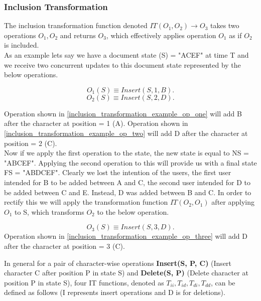 \documentclass[9pt, titlepage]{article}
\begin{document}
  \subsubsection{Inclusion Transformation}
  The inclusion transformation function denoted \(IT(O_{1}, O_{2}) \rightarrow O_{3}\) takes two operations \(O_{1}, O_{2}\) and returns \(O_{3}\),
  which effectively applies operation \(O_{1}\) as if \(O_{2}\) is included. \\

  As an example lets say we have a document state (S) = "ACEF" at time T and we receive two concurrent updates to this document state represented by the below operations.

  \begin{equation} \label{inclusion_transformation_example_op_one}
    O_{1}(S) \equiv Insert(S, 1, B).
  \end{equation}
  \begin{equation} \label{inclusion_transformation_example_op_two}
    O_{2}(S) \equiv Insert(S, 2, D).
  \end{equation}

  Operation shown in \ref{inclusion_transformation_example_op_one} will add B after the character at position = 1 (A).
  Operation shown in \ref{inclusion_transformation_example_op_two} will add D after the character at position = 2 (C). \\

  Now if we apply the first operation to the state, the new state is equal to NS = "ABCEF". Applying the second operation to this will provide us with a final state FS = "ABDCEF".
  Clearly we lost the intention of the users, the first user intended for B to be added between A and C, the second user intended for D to be added between C and E.
  Instead, D was added between B and C. In order to rectify this we will apply the transformation function \(IT(O_{2}, O_{1})\) after applying \(O_{1}\) to S,
  which transforms \(O_{2}\) to the below operation.

  \begin{equation} \label{inclusion_transformation_example_op_three}
    O_{3}(S) \equiv Insert(S, 3, D).
  \end{equation}
  Operation shown in \ref{inclusion_transformation_example_op_three} will add D after the character at position = 3 (C).

  In general for a pair of character-wise operations \textbf{Insert(S, P, C)} (Insert character C after position P in state S) and
  \textbf{Delete(S, P)} (Delete character at position P in state S), four IT functions, denoted as \(T_{ii}, T_{id}, T_{di}, T_{dd}\), 
  can be defined as follows (I represents insert operations and D is for deletions).
\end{document}
